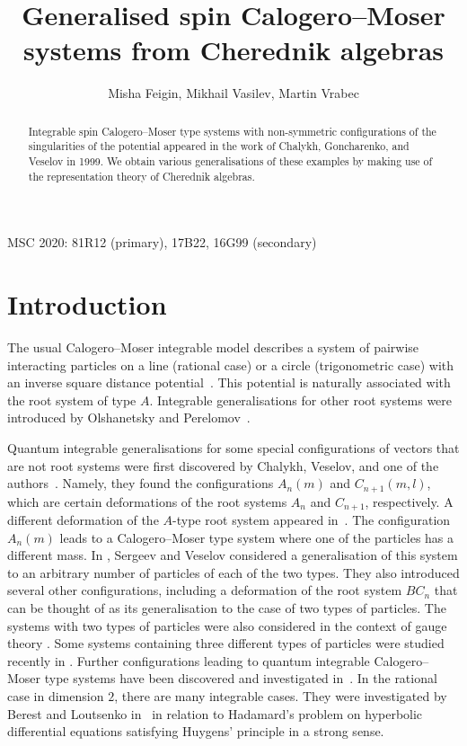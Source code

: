 \documentclass[12pt]{amsart}
\title[Generalised spin Calogero--Moser systems]{Generalised spin Calogero--Moser systems from Cherednik algebras}
\author{Misha Feigin, Mikhail Vasilev, Martin Vrabec}
\numberwithin{equation}{section}
\theoremstyle{definition}
\begin{document}
\begin{abstract}
    Integrable spin Calogero--Moser type systems with non-symmetric configurations
    of the singularities of the potential appeared in the work of Chalykh, Goncharenko, 
    and Veselov in 1999. We obtain
        various generalisations of these examples 
    by making use of the representation theory of Cherednik algebras.
\end{abstract}



\maketitle



\tableofcontents


MSC 2020: 81R12 (primary), 17B22, 16G99 (secondary)

\section{Introduction}


The usual Calogero--Moser integrable model describes a system of pairwise interacting particles on a line (rational case) or a circle (trigonometric case) with an inverse square distance potential~\cite{Calogero, Moser, Sutherland}. This potential is naturally associated with the root system of type $A$. Integrable generalisations for other root systems were introduced by Olshanetsky and Perelomov~\cite{OP}.

  Quantum integrable generalisations for some special configurations of vectors that are not root systems were first discovered by Chalykh, Veselov, and one of the authors~\cite{VFC, CFV'98, CFV'99}. Namely, they found the configurations $A_n(m)$ and $C_{n+1}(m,l)$, which are certain deformations of the root systems $A_n$ and $C_{n+1}$, respectively.   
  A different deformation of the $A$-type root system appeared in~\cite{CVlocus}.
  The configuration $A_n(m)$ leads to a Calogero--Moser type system where one of the particles has a different mass. In \cite{SV}, Sergeev and Veselov considered a generalisation of this system to an arbitrary number of particles of each of the two types. They also introduced several other configurations, including a deformation of the root system $BC_n$ that can be thought of as its generalisation to the case of two types of particles. The systems with two types of particles were also considered in the context of gauge theory \cite{Kimura}. Some systems containing three different types of particles were studied recently in \cite{GR, BC}.
  Further configurations leading to quantum integrable Calogero--Moser type systems have been discovered and investigated in~\cite{Feigin, FF, FV19}. 
  In the rational case in dimension $2$, there are many integrable cases. They were investigated by Berest and Loutsenko in~\cite{BL} in relation to Hadamard's problem  on hyperbolic differential equations satisfying Huygens' principle in a strong sense.
\end{document}
